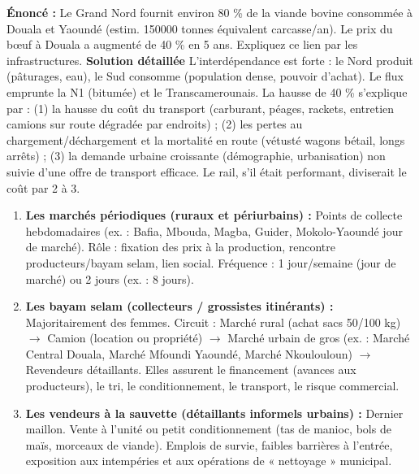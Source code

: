 \documentclass[11pt]{article}
\newcounter{popsec}
\newcounter{popsub}
\newcommand{\courssub}[1]{%
  \stepcounter{popsub}%
  \par\vspace{9pt}\noindent{\popxbold\fontsize{11.5}{13}\selectfont\color{popink}{\color{poporange}\thepopsec.\thepopsub}\hspace{6pt}#1}\par\nopagebreak\vspace{4pt}
}
\begin{document}
\begin{exoresolu}
\textbf{Énoncé :} Le Grand Nord fournit environ 80 \% de la viande bovine consommée à Douala et Yaoundé (estim. \num{150000} tonnes équivalent carcasse/an). Le prix du bœuf à Douala a augmenté de 40 \% en 5 ans. Expliquez ce lien par les infrastructures.
\tcblower
\textbf{Solution détaillée}
L'interdépendance est forte : le Nord produit (pâturages, eau), le Sud consomme (population dense, pouvoir d'achat). Le flux emprunte la N1 (bitumée) et le Transcamerounais. La hausse de 40 \% s'explique par : (1) la hausse du coût du transport (carburant, péages, rackets, entretien camions sur route dégradée par endroits) ; (2) les pertes au chargement/déchargement et la mortalité en route (vétusté wagons bétail, longs arrêts) ; (3) la demande urbaine croissante (démographie, urbanisation) non suivie d'une offre de transport efficace. Le rail, s'il était performant, diviserait le coût par 2 à 3.
\end{exoresolu}

\courssub{L'organisation du commerce intérieur}

\begin{definition}
\begin{enumerate}
\item \textbf{Les marchés périodiques (ruraux et périurbains) :} Points de collecte hebdomadaires (ex. : Bafia, Mbouda, Magba, Guider, Mokolo-Yaoundé jour de marché). Rôle : fixation des prix à la production, rencontre producteurs/bayam selam, lien social. Fréquence : 1 jour/semaine (jour de marché) ou 2 jours (ex. : 8 jours).
\item \textbf{Les bayam selam (collecteurs / grossistes itinérants) :} Majoritairement des femmes. Circuit : Marché rural (achat sacs 50/100 kg) $\rightarrow$ Camion (location ou propriété) $\rightarrow$ Marché urbain de gros (ex. : Marché Central Douala, Marché Mfoundi Yaoundé, Marché Nkoulouloun) $\rightarrow$ Revendeurs détaillants. Elles assurent le financement (avances aux producteurs), le tri, le conditionnement, le transport, le risque commercial.
\item \textbf{Les vendeurs à la sauvette (détaillants informels urbains) :} Dernier maillon. Vente à l'unité ou petit conditionnement (tas de manioc, bols de maïs, morceaux de viande). Emplois de survie, faibles barrières à l'entrée, exposition aux intempéries et aux opérations de « nettoyage » municipal.
\end{enumerate}
\end{definition}
\end{document}
